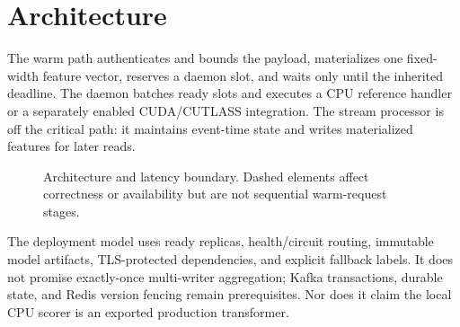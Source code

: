 \documentclass[10pt,a4paper,twocolumn]{article}
\begin{document}
\section{Architecture}
The warm path authenticates and bounds the payload, materializes one fixed-width
feature vector, reserves a daemon slot, and waits only until the inherited
deadline. The daemon batches ready slots and executes a CPU reference handler or
a separately enabled CUDA/CUTLASS integration. The stream processor is off the
critical path: it maintains event-time state and writes materialized features
for later reads.

\begin{figure}[t]\centering
{}
\caption{Architecture and latency boundary. Dashed elements affect correctness or availability but are not sequential warm-request stages.}\label{fig:architecture}
\end{figure}

The deployment model uses ready replicas, health/circuit routing, immutable model
artifacts, TLS-protected dependencies, and explicit fallback labels. It does not
promise exactly-once multi-writer aggregation; Kafka transactions, durable state,
and Redis version fencing remain prerequisites. Nor does it claim the local CPU
scorer is an exported production transformer.
\end{document}
